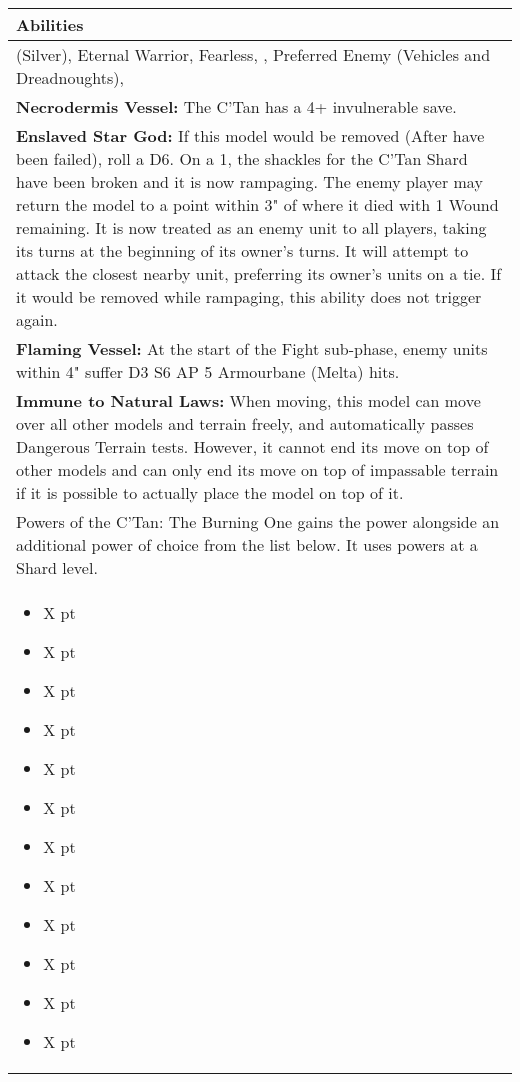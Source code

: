 \noindent
\begin{tabular}{||m{532pt}||}
	\hline
	Abilities \\
	\hline
	\quickref{Awakening Protocols} (Silver), Eternal Warrior, Fearless, \quickref{Living Metal}, Preferred Enemy (Vehicles and Dreadnoughts), \quickref{Reanimation Protocols} \\
	\textbf{Necrodermis Vessel:} The C'Tan has a 4+ invulnerable save. \\
	\textbf{Enslaved Star God:} If this model would be removed (After \quickref{Reanimation Protocols} have been failed), roll a D6. On a 1, the shackles for the C'Tan Shard have been broken and it is now rampaging. The enemy player may return the model to a point within 3" of where it died with 1 Wound remaining. It is now treated as an enemy unit to all players, taking its turns at the beginning of its owner's turns. It will attempt to attack the closest nearby unit, preferring its owner's units on a tie. If it would be removed while rampaging, this ability does not trigger again. \\
	\textbf{Flaming Vessel:} At the start of the Fight sub-phase, enemy units within 4" suffer D3 S6 AP 5 Armourbane (Melta) hits.\\
	\textbf{Immune to Natural Laws:} When moving, this model can move over all other models and terrain 	freely, and automatically passes Dangerous Terrain tests. However, it 	cannot end its move on top of other models and can only end its move on top of impassable terrain if it is possible to actually place the model on top of it. \\
	Powers of the C'Tan: The Burning One gains the \quickref{Lord of Fire} power alongside an additional power of choice from the list below. It uses powers at a Shard level. \\
	\begin{itemize}
		\item \quickref{Antimatter Meteor} \hrulefill X pt
		\item \quickref{Cosmic Fire} \hrulefill X pt
		\item \quickref{Entropic Touch} \hrulefill X pt
		\item \quickref{Moulder of Worlds} \hrulefill X pt
		\item \quickref{Pyreshards} \hrulefill X pt
		\item \quickref{Sentient Singularity} \hrulefill X pt
		\item \quickref{Seismic Assault} \hrulefill X pt
		\item \quickref{Sky of Falling Stars} \hrulefill X pt
		\item \quickref{Swarm of Spirit Dust} \hrulefill X pt
		\item \quickref{Time's Arrow} \hrulefill X pt
		\item \quickref{Transdimensional Thunderbolt} \hrulefill X pt
		\item \quickref{Withering Worldscape} \hrulefill X pt
	\end{itemize} \\
	\hline
\end{tabular}


